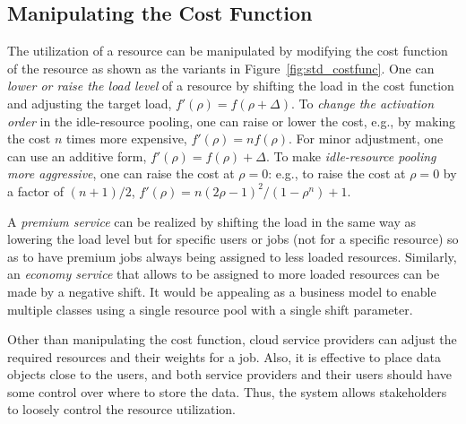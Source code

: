 
\subsection{Manipulating the Cost Function}
\label{sec:variation}

The utilization of a resource can be manipulated by modifying the cost
function of the resource as shown as the variants in Figure~\ref{fig:std_costfunc}.
One can {\em lower or raise the load level} of a resource by shifting
the load in the cost function and adjusting the target load,
$f'(\rho) = f(\rho + \Delta)$.
To {\em change the activation order} in the idle-resource pooling,
one can raise or lower the cost,
e.g., by making the cost  $n$ times more expensive, $f'(\rho) = n f(\rho)$.
For minor adjustment, one can use an additive form,
$f'(\rho) = f(\rho) + \Delta$.
To make {\em idle-resource pooling more aggressive},
one can raise the cost at $\rho = 0$:
e.g., to raise the cost at $\rho = 0$ by a factor of $(n+1)/2$,
$f'(\rho) = n (2\rho - 1)^{2}/(1 - \rho^{n}) + 1$.

A {\em premium service} can be realized by shifting the load
in the same way as lowering the load level
but for specific users or jobs (not for a specific resource) so as to
have premium jobs always being assigned to less loaded resources.
Similarly, an {\em economy service} that allows to be assigned to more
loaded resources can be made by a negative shift.
It would be appealing as a business model to enable multiple classes using a single
resource pool with a single shift parameter.


Other than manipulating the cost function,
cloud service providers can adjust the required resources and their
weights for a job.  Also, it is effective to place data objects close to the
users, and both service providers and their users should have some
control over where to store the data.
Thus, the system allows stakeholders to loosely control the
resource utilization.
